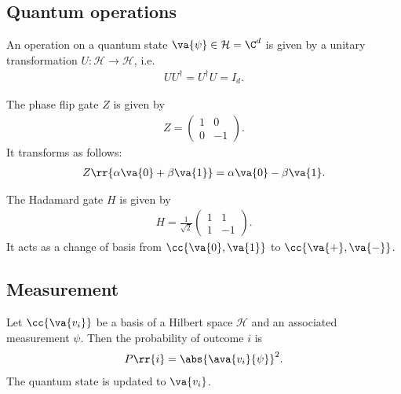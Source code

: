 \documentclass{article}
\begin{document}
\subsection{Quantum operations}
\label{sec:quantum-operations}

\begin{definition}
  \label{def:quantum-operation}
  An operation on a quantum state $ \va{ \psi } \in \mathcal H = \C^d$ is given by
  a unitary transformation $U:\mathcal H \to \mathcal H$, i.e.
  \begin{align*}
    UU^\dagger = U^\dagger U = I_d.
  \end{align*}
\end{definition}


\begin{definition}
  \label{def:phase-flip}
  The phase flip gate $Z$ is given by
  \begin{align*}
    Z = \begin{pmatrix} 1 & 0 \\ 0 & -1 \end{pmatrix}.
  \end{align*}
  It transforms as follows:
  \begin{align*}
    Z \rr{ \alpha \va{ 0 } + \beta \va{ 1 } } = \alpha \va{ 0 } - \beta \va{ 1 }.
  \end{align*}
\end{definition}


\begin{definition}
  \label{def:hadamard}
  The Hadamard gate $H$ is given by
  \begin{align*}
    H = \frac{1}{\sqrt{2}} \begin{pmatrix} 1 & 1 \\ 1 & -1 \end{pmatrix}.
  \end{align*}
  It acts as a change of basis from $ \cc{ \va{ 0 }, \va{ 1 } } $ to $ \cc{ \va{ + }, \va{ - } }$.
\end{definition}


\subsection{Measurement}
\label{sec:measurement}

\begin{definition}
  \label{def:probability-of-outcome}
  Let $\cc{\va{v_i}}$ be a basis of a Hilbert space $\mathcal{H}$ and an associated measurement $\psi$.
  Then the probability of outcome $i$ is
  \begin{align*}
    P\rr{i} = \abs{\ava{v_i}{\psi}}^2.
  \end{align*}
  The quantum state is updated to $\va{v_i}$.
\end{definition}
\end{document}
